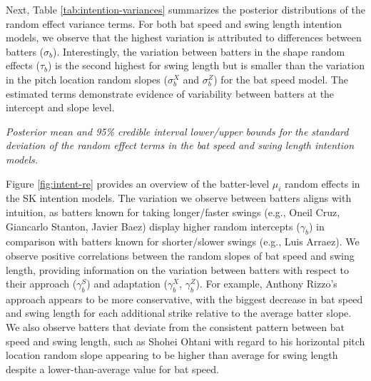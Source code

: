 \documentclass{article}
\begin{document}
      Next, Table \ref{tab:intention-variances} summarizes the posterior distributions of the random effect variance terms. For both bat speed and swing length intention models, we observe that the highest variation is attributed to differences between batters ($\sigma_b$). Interestingly, the variation between batters in the shape random effects ($\tau_b$) is the second highest for swing length but is smaller than the variation in the pitch location random slopes ($\sigma_b^X$ and $\sigma_b^Z$) for the bat speed model. The estimated terms demonstrate evidence of variability between batters at the intercept and slope level.
       
      \begin{table}[H]
        \centering
        
        \caption{\it Posterior mean and 95\% credible interval lower/upper bounds for the standard deviation of the random effect terms in the bat speed and swing length intention models.}
        \label{tab:intention-variances}
      \end{table}

      Figure \ref{fig:intent-re} provides an overview of the batter-level $\mu_i$ random effects in the SK intention models. The variation we observe between batters aligns with intuition, as batters known for taking longer/faster swings (e.g., Oneil Cruz, Giancarlo Stanton, Javier Baez) display higher random intercepts ($\gamma_b$) in comparison with batters known for shorter/slower swings (e.g., Luis Arraez). We observe positive correlations between the random slopes of bat speed and swing length, providing information on the variation between batters with respect to their approach ($\gamma_b^S$) and adaptation ($\gamma_b^X$, $\gamma_b^Z$). For example, Anthony Rizzo's approach appears to be more conservative, with the biggest decrease in bat speed and swing length for each additional strike relative to the average batter slope. We also observe batters that deviate from the consistent pattern between bat speed and swing length, such as Shohei Ohtani with regard to his horizontal pitch location random slope appearing to be higher than average for swing length despite a lower-than-average value for bat speed. 
      
\end{document}
